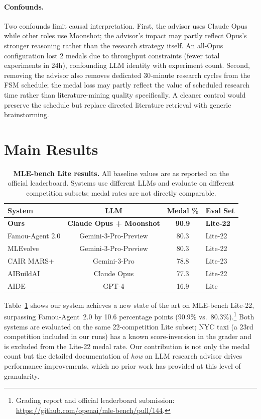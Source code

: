 \documentclass{article}
\begin{document}
\paragraph{Confounds.} Two confounds limit causal interpretation. First, the advisor uses Claude Opus while other roles use Moonshot; the advisor's impact may partly reflect Opus's stronger reasoning rather than the research strategy itself. An all-Opus configuration lost 2 medals due to throughput constraints (fewer total experiments in 24h), confounding LLM identity with experiment count. Second, removing the advisor also removes dedicated 30-minute research cycles from the FSM schedule; the medal loss may partly reflect the value of scheduled research time rather than literature-mining quality specifically. A cleaner control would preserve the schedule but replace directed literature retrieval with generic brainstorming.

\section{Main Results}
\label{sec:results}

\begin{table}[t]
\centering
\caption{\textbf{MLE-bench Lite results.} All baseline values are as reported on the official leaderboard. Systems use different LLMs and evaluate on different competition subsets; medal rates are not directly comparable.}
\label{tab:main_results}
\small
\begin{tabular}{lccl}
\toprule
\textbf{System} & \textbf{LLM} & \textbf{Medal \%} & \textbf{Eval Set} \\
\midrule
\textbf{Ours} & \textbf{Claude Opus + Moonshot} & \textbf{90.9} & \textbf{Lite-22} \\
Famou-Agent 2.0 & Gemini-3-Pro-Preview & 80.3 & Lite-22 \\
MLEvolve & Gemini-3-Pro-Preview & 80.3 & Lite-22 \\
CAIR MARS+ & Gemini-3-Pro & 78.8 & Lite-23 \\
AIBuildAI & Claude Opus & 77.3 & Lite-22 \\
AIDE & GPT-4 & 16.9 & Lite \\
\bottomrule
\end{tabular}
\end{table}

Table~\ref{tab:main_results} shows our system achieves a new state of the art on MLE-bench Lite-22, surpassing Famou-Agent~2.0 by 10.6 percentage points (90.9\% vs.\ 80.3\%).\footnote{Grading report and official leaderboard submission: \url{https://github.com/openai/mle-bench/pull/144}.} Both systems are evaluated on the same 22-competition Lite subset; NYC taxi (a 23rd competition included in our runs) has a known score-inversion in the grader and is excluded from the Lite-22 medal rate. Our contribution is not only the medal count but the detailed documentation of \emph{how} an LLM research advisor drives performance improvements, which no prior work has provided at this level of granularity.
\end{document}
